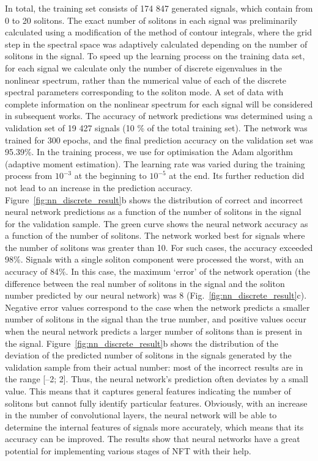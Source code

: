 In total, the training set consists of 174 847 generated signals, which contain from 0 to 20 solitons. The exact number
of solitons in each signal was preliminarily calculated using
a modification of the method of contour integrals,
where the grid step in the spectral space was adaptively calculated depending on the number of solitons in the signal.
To speed up the learning process on the training data set, for
each signal we calculate only the number of discrete eigenvalues in the nonlinear spectrum, rather than the numerical
value of each of the discrete spectral parameters corresponding to the soliton mode. A set of data with complete information on the nonlinear spectrum for each signal will be
considered in subsequent works. The accuracy of network
predictions was determined using a validation set of
19 427 signals (10 \% of the total training set). The network
was trained for 300 epochs, and the final prediction accuracy
on the validation set was 95.39\%. In the training process, we
use for optimisation the Adam algorithm (adaptive moment
estimation). The learning rate was varied during the training
process from $10^{-3}$ at the beginning to $10^{-5}$ at the end. 
Its further reduction did not lead to an increase in the prediction
accuracy.
Figure~\ref{fig:nn_discrete_result}b shows the distribution of correct and incorrect
neural network predictions as a function of the number of
solitons in the signal for the validation sample. The green
curve shows the neural network accuracy as a function of the
number of solitons. The network worked best for signals
where the number of solitons was greater than 10. For such
cases, the accuracy exceeded 98\%. Signals with a single soliton component were processed the worst, with an accuracy of
84\%. In this case, the maximum ‘error’ of the network operation (the difference between the real number of solitons in the
signal and the soliton number predicted by our neural network) was 8 (Fig.~\ref{fig:nn_discrete_result}c). Negative error values correspond to the
case when the network predicts a smaller number of solitons
in the signal than the true number, and positive values occur
when the neural network predicts a larger number of solitons
than is present in the signal. Figure~\ref{fig:nn_discrete_result}b shows the distribution
of the deviation of the predicted number of solitons in the
signals generated by the validation sample from their actual
number: most of the incorrect results are in the range [–2; 2].
Thus, the neural network’s prediction often deviates by a
small value. This means that it captures general features indicating the number of solitons but cannot fully identify particular features. Obviously, with an increase in the number of
convolutional layers, the neural network will be able to determine the internal features of signals more accurately, which
means that its accuracy can be improved. The results show
that neural networks have a great potential for implementing
various stages of NFT with their help.

